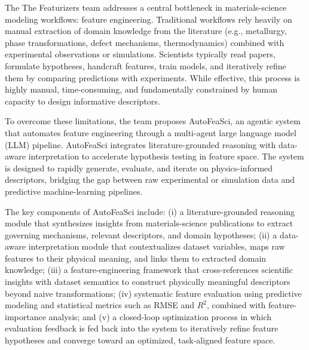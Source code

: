 %

The The Featurizers team addresses a central bottleneck in materials-science modeling workflows: feature engineering. Traditional workflows rely heavily on manual extraction of domain knowledge from the literature (e.g., metallurgy, phase transformations, defect mechanisms, thermodynamics) combined with experimental observations or simulations. Scientists typically read papers, formulate hypotheses, handcraft features, train models, and iteratively refine them by comparing predictions with experiments. While effective, this process is highly manual, time-consuming, and fundamentally constrained by human capacity to design informative descriptors.

To overcome these limitations, the team proposes AutoFeaSci, an agentic system that automates feature engineering through a multi-agent large language model (LLM) pipeline. AutoFeaSci integrates literature-grounded reasoning with data-aware interpretation to accelerate hypothesis testing in feature space. The system is designed to rapidly generate, evaluate, and iterate on physics-informed descriptors, bridging the gap between raw experimental or simulation data and predictive machine-learning pipelines.

The key components of AutoFeaSci include: (i) a literature-grounded reasoning module that synthesizes insights from materials-science publications to extract governing mechanisms, relevant descriptors, and domain hypotheses; (ii) a data-aware interpretation module that contextualizes dataset variables, maps raw features to their physical meaning, and links them to extracted domain knowledge; (iii) a feature-engineering framework that cross-references scientific insights with dataset semantics to construct physically meaningful descriptors beyond naive transformations; (iv) systematic feature evaluation using predictive modeling and statistical metrics such as RMSE and $R^2$, combined with feature-importance analysis; and (v) a closed-loop optimization process in which evaluation feedback is fed back into the system to iteratively refine feature hypotheses and converge toward an optimized, task-aligned feature space.

